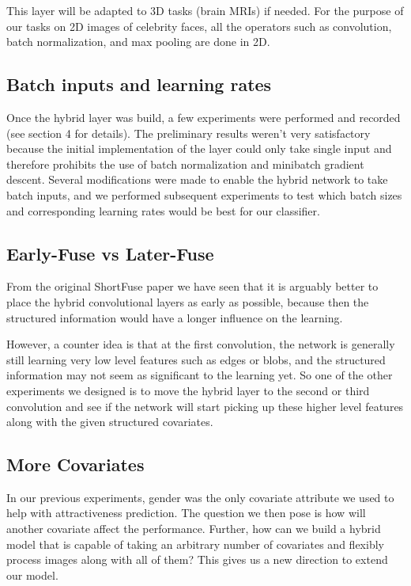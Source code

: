 \documentclass[12pt]{article}
\begin{document}
This layer will be adapted to 3D tasks (brain MRIs) if needed. For the purpose of our tasks on 2D images of celebrity faces, all the operators such as convolution, batch normalization, and max pooling are done in 2D. 

\subsection{Batch inputs and learning rates}
Once the hybrid layer was build, a few experiments were performed and recorded (see section 4 for details). The preliminary results weren't very satisfactory because the initial implementation of the layer could only take single input and therefore prohibits the use of batch normalization and minibatch gradient descent. Several modifications were made to enable the hybrid network to take batch inputs, and we performed subsequent experiments to test which batch sizes and corresponding learning rates would be best for our classifier. 

\subsection{Early-Fuse vs Later-Fuse}
From the original ShortFuse paper we have seen that it is arguably better to place the hybrid convolutional layers as early as possible, because then the structured information would have a longer influence on the learning. 

However, a counter idea is that at the first convolution, the network is generally still learning very low level features such as edges or blobs, and the structured information may not seem as significant to the learning yet. So one of the other experiments we designed is to move the hybrid layer to the second or third convolution and see if the network will start picking up these higher level features along with the given structured covariates. 

\subsection{More Covariates}
In our previous experiments, gender was the only covariate attribute we used to help with attractiveness prediction. The question we then pose is how will another covariate affect the performance. Further, how can we build a hybrid model that is capable of taking an arbitrary number of covariates and flexibly process images along with all of them? This gives us a new direction to extend our model. 
\end{document}
